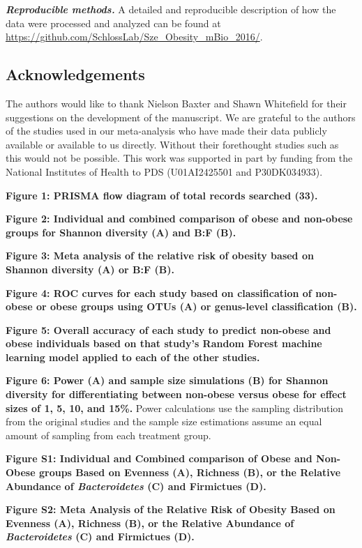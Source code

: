 \documentclass[12pt,]{article}
\begin{document}
\textbf{\emph{Reproducible methods.}} A detailed and reproducible
description of how the data were processed and analyzed can be found at
\url{https://github.com/SchlossLab/Sze_Obesity_mBio_2016/}.

\subsection{Acknowledgements}\label{acknowledgements}

The authors would like to thank Nielson Baxter and Shawn Whitefield for
their suggestions on the development of the manuscript. We are grateful
to the authors of the studies used in our meta-analysis who have made
their data publicly available or available to us directly. Without their
forethought studies such as this would not be possible. This work was
supported in part by funding from the National Institutes of Health to
PDS (U01AI2425501 and P30DK034933).

\newpage

\textbf{Figure 1: PRISMA flow diagram of total records searched (33).}

\textbf{Figure 2: Individual and combined comparison of obese and
non-obese groups for Shannon diversity (A) and B:F (B).}

\textbf{Figure 3: Meta analysis of the relative risk of obesity based on
Shannon diversity (A) or B:F (B).}

\textbf{Figure 4: ROC curves for each study based on classification of
non-obese or obese groups using OTUs (A) or genus-level classification
(B).}

\textbf{Figure 5: Overall accuracy of each study to predict non-obese
and obese individuals based on that study's Random Forest machine
learning model applied to each of the other studies.}

\textbf{Figure 6: Power (A) and sample size simulations (B) for Shannon
diversity for differentiating between non-obese versus obese for effect
sizes of 1, 5, 10, and 15\%.} Power calculations use the sampling
distribution from the original studies and the sample size estimations
assume an equal amount of sampling from each treatment group.

\newpage

\textbf{Figure S1: Individual and Combined comparison of Obese and
Non-Obese groups Based on Evenness (A), Richness (B), or the Relative
Abundance of \emph{Bacteroidetes} (C) and Firmictues (D).}

\textbf{Figure S2: Meta Analysis of the Relative Risk of Obesity Based
on Evenness (A), Richness (B), or the Relative Abundance of
\emph{Bacteroidetes} (C) and Firmictues (D).}
\end{document}
